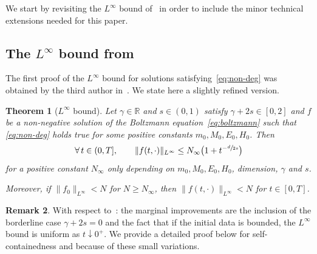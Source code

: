 \documentclass[JEP,XML,SOM,Unicode,NoFloatCountersInSection]{cedram}
\theoremstyle{plain}
\newtheorem{thm}{Theorem}[section]
\theoremstyle{definition}
\newtheorem{remark}[thm]{Remark}
\numberwithin{equation}{section}
\newcommand{\R}{\mathbb R}
\let\A N
\newcommand{\Ai}{N_\infty}
\begin{document}
We start by revisiting the $L^\infty$ bound
of~\cite{luis} in order to include the minor technical extensions
needed for this paper.

\subsection{The $L^\infty$ bound from \cite{luis}}

The first proof of the $L^\infty$ bound for solutions
satisfying~\eqref{eq:non-deg} was obtained by the third author
in~\cite[Th.\,1.2]{luis}. We state here a slightly refined version.

\begin{thm}[$L^\infty$ bound] \label{thm:linfty} Let
$\gamma \in \R$ and $s \in (0,1)$ satisfy $\gamma +2s \in [0,2]$ and
$f$ be a non-negative solution of the Boltzmann
equation~\eqref{eq:boltzmann} such that \eqref{eq:non-deg} holds
true for some positive constants $m_0,M_0,E_0,H_0$. Then
\[ \forall \, t \in (0,T], \qquad \|f(t,\cdot)\|_{L^\infty} \le \Ai
\bigl(1+ t^{-\sfrac{d}{2s}}\bigr) \] for a positive constant $\Ai$
only depending on $m_0,M_0,E_0,H_0$, dimension, $\gamma$ and $s$.

Moreover, if $\|f_0\|_{L^\infty} < \A$ for $\A \ge \A_\infty$, then $\|f(t,\cdot)\|_{L^\infty} < \A$ for $t\in[0,T]$.
\end{thm}

\begin{remark}
With respect to~\cite[Th.\,1.2]{luis}: the marginal improvements
are the inclusion of the borderline case $\gamma+2s=0$ and the fact
that if the initial data is bounded, the $L^\infty$ bound is uniform
as $t \downarrow 0^+$. We provide a detailed proof below for
self-containedness and because of these small variations.
\end{remark}
\end{document}
